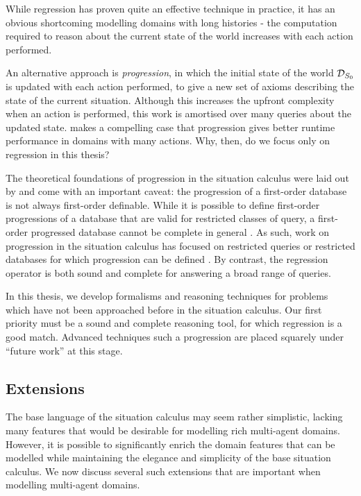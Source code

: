 While regression has proven quite an effective technique in practice,
it has an obvious shortcoming modelling domains with long histories
- the computation required to reason about the current state of the
world increases with each action performed.

An alternative approach is \emph{progression}, in which the initial
state of the world $\mathcal{D}_{S_{0}}$ is updated with each action performed,
to give a new set of axioms describing the state of the current situation.
Although this increases the upfront complexity when an action is performed,
this work is amortised over many queries about the updated state.
\citet{thielscher04case_for_progression} makes a compelling case
that progression gives better runtime performance in domains with
many actions. Why, then, do we focus only on regression in this thesis?

The theoretical foundations of progression in the situation calculus
were laid out by \citet{reiter97progression} and come with an important
caveat: the progression of a first-order database is not always first-order
definable. While it is possible to define first-order progressions
of a database that are valid for restricted classes of query, a first-order
progressed database cannot be complete in general \citep{vassos08progression_future_queries}.
As such, work on progression in the situation calculus has focused
on restricted queries or restricted databases for which progression
can be defined \citep{liu05sc_progression_knowledge,vassos07progression,vassos08fo_strong_progression}.
By contrast, the regression operator is both sound and complete for
answering a broad range of queries.

In this thesis, we develop formalisms and reasoning techniques for
problems which have not been approached before in the situation calculus.
Our first priority must be a sound and complete reasoning tool, for
which regression is a good match. Advanced techniques such a progression
are placed squarely under {}``future work'' at this stage.


\subsection{Extensions}

The base language of the situation calculus may seem rather simplistic,
lacking many features that would be desirable for modelling rich multi-agent
domains. However, it is possible to significantly enrich the domain
features that can be modelled while maintaining the elegance and simplicity
of the base situation calculus. We now discuss several such extensions
that are important when modelling multi-agent domains.


